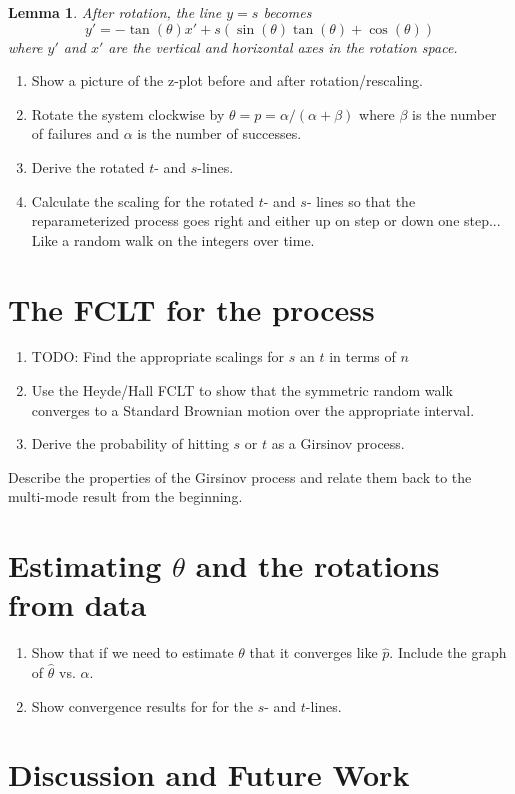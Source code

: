 \documentclass{article}
\newtheorem{lemma}{Lemma}
\begin{document}
\begin{lemma}
After rotation, the line $y=s$ becomes
\begin{equation}
y' = -\tan(\theta) x' + s \left(\sin(\theta) \tan(\theta) + \cos(\theta) \right)
\end{equation}
where $y'$ and $x'$ are the vertical and horizontal axes in the rotation
space.
\end{lemma}

\begin{enumerate}
\item Show a picture of the z-plot before and after rotation/rescaling.
\item Rotate the system clockwise by $\theta = p = \alpha/(\alpha+\beta)$ 
where $\beta$ is the number of failures and $\alpha$ is the number of successes.
\item Derive the rotated $t$- and $s$-lines.
\item Calculate the scaling for the rotated $t$- and $s$- lines so that the
reparameterized process goes right and either up on step or down one step...
Like a random walk on the integers over time.
\end{enumerate}

\section{The FCLT for the process} \label{sect:fclt}

\begin{enumerate}
\item TODO: Find the appropriate scalings for $s$ an $t$ in terms of $n$
\item Use the Heyde/Hall FCLT to show that the symmetric random walk
converges to a Standard Brownian motion over the appropriate interval.
\item Derive the probability of hitting $s$ or $t$ as a Girsinov process.
\end{enumerate}

Describe the properties of the Girsinov process and relate them back to 
the multi-mode result from the beginning.

\section{Estimating $\theta$ and the rotations from data} \label{sect:stat}

\begin{enumerate}
\item Show that if we need to estimate $\theta$ that it converges like 
$\widehat{p}$. Include the graph of $\widehat{\theta}$ vs. $\alpha$.
\item Show convergence results for for the $s$- and $t$-lines. 
\end{enumerate}

\section{Discussion and Future Work} \label{sect:discussion}



\end{document}
